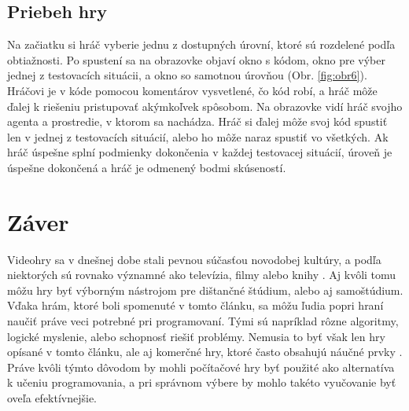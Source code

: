 \documentclass[slovak,a4paper,10pt]{article}
\begin{document}
\subsection{Priebeh hry}
Na začiatku si hráč vyberie jednu z dostupných úrovní, ktoré sú rozdelené podľa obtiažnosti. Po spustení sa na obrazovke objaví okno s kódom, okno pre výber jednej z testovacích situácii, a okno so samotnou úrovňou (Obr. \ref{fig:obr6}). Hráčovi je v kóde pomocou komentárov vysvetlené, čo kód robí, a hráč môže ďalej k riešeniu pristupovať akýmkoľvek spôsobom. Na obrazovke vidí hráč svojho agenta a prostredie, v ktorom sa nachádza. Hráč si ďalej môže svoj kód spustiť len v jednej z testovacích situácií, alebo ho môže naraz spustiť vo všetkých. Ak hráč úspešne splní podmienky dokončenia v každej testovacej situácií, úroveň je úspešne dokončená a hráč je odmenený bodmi skúseností.\\

\section{Záver}

Videohry sa v dnešnej dobe stali pevnou súčasťou novodobej kultúry, a podľa niektorých sú rovnako významné ako televízia, filmy alebo knihy \cite{muratet2009towards}. Aj kvôli tomu môžu hry byť výborným nástrojom pre dištančné štúdium, alebo aj samoštúdium. Vďaka hrám, ktoré boli spomenuté v tomto článku, sa môžu ľudia popri hraní naučiť práve veci potrebné pri programovaní. Tými sú napríklad rôzne algoritmy, logické myslenie, alebo schopnosť riešiť problémy. Nemusia to byť však len hry opísané v tomto článku, ale aj komerčné hry, ktoré často obsahujú náučné prvky \cite{barr2018student}. Práve kvôli týmto dôvodom by mohli počítačové hry byť použité ako alternatíva k učeniu programovania, a pri správnom výbere by mohlo takéto vyučovanie byť oveľa efektívnejšie.



\end{document}
